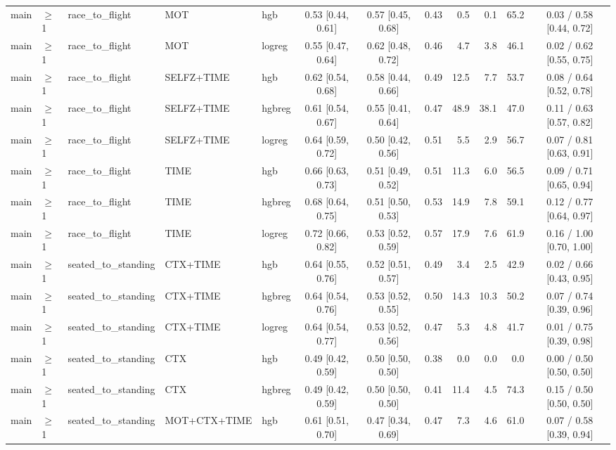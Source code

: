 \begin{longtable}{@{}lllllcccrrrc@{}}
main & $\geq$1 & race\_to\_flight & MOT & hgb & 0.53 [0.44, 0.61] & 0.57 [0.45, 0.68] & 0.43 & 0.5 & 0.1 & 65.2 & 0.03 / 0.58 [0.44, 0.72] \\
main & $\geq$1 & race\_to\_flight & MOT & logreg & 0.55 [0.47, 0.64] & 0.62 [0.48, 0.72] & 0.46 & 4.7 & 3.8 & 46.1 & 0.02 / 0.62 [0.55, 0.75] \\
main & $\geq$1 & race\_to\_flight & SELFZ+TIME & hgb & 0.62 [0.54, 0.68] & 0.58 [0.44, 0.66] & 0.49 & 12.5 & 7.7 & 53.7 & 0.08 / 0.64 [0.52, 0.78] \\
main & $\geq$1 & race\_to\_flight & SELFZ+TIME & hgbreg & 0.61 [0.54, 0.67] & 0.55 [0.41, 0.64] & 0.47 & 48.9 & 38.1 & 47.0 & 0.11 / 0.63 [0.57, 0.82] \\
main & $\geq$1 & race\_to\_flight & SELFZ+TIME & logreg & 0.64 [0.59, 0.72] & 0.50 [0.42, 0.56] & 0.51 & 5.5 & 2.9 & 56.7 & 0.07 / 0.81 [0.63, 0.91] \\
main & $\geq$1 & race\_to\_flight & TIME & hgb & 0.66 [0.63, 0.73] & 0.51 [0.49, 0.52] & 0.51 & 11.3 & 6.0 & 56.5 & 0.09 / 0.71 [0.65, 0.94] \\
main & $\geq$1 & race\_to\_flight & TIME & hgbreg & 0.68 [0.64, 0.75] & 0.51 [0.50, 0.53] & 0.53 & 14.9 & 7.8 & 59.1 & 0.12 / 0.77 [0.64, 0.97] \\
main & $\geq$1 & race\_to\_flight & TIME & logreg & 0.72 [0.66, 0.82] & 0.53 [0.52, 0.59] & 0.57 & 17.9 & 7.6 & 61.9 & 0.16 / 1.00 [0.70, 1.00] \\
main & $\geq$1 & seated\_to\_standing & CTX+TIME & hgb & 0.64 [0.55, 0.76] & 0.52 [0.51, 0.57] & 0.49 & 3.4 & 2.5 & 42.9 & 0.02 / 0.66 [0.43, 0.95] \\
main & $\geq$1 & seated\_to\_standing & CTX+TIME & hgbreg & 0.64 [0.54, 0.76] & 0.53 [0.52, 0.55] & 0.50 & 14.3 & 10.3 & 50.2 & 0.07 / 0.74 [0.39, 0.96] \\
main & $\geq$1 & seated\_to\_standing & CTX+TIME & logreg & 0.64 [0.54, 0.77] & 0.53 [0.52, 0.56] & 0.47 & 5.3 & 4.8 & 41.7 & 0.01 / 0.75 [0.39, 0.98] \\
main & $\geq$1 & seated\_to\_standing & CTX & hgb & 0.49 [0.42, 0.59] & 0.50 [0.50, 0.50] & 0.38 & 0.0 & 0.0 & 0.0 & 0.00 / 0.50 [0.50, 0.50] \\
main & $\geq$1 & seated\_to\_standing & CTX & hgbreg & 0.49 [0.42, 0.59] & 0.50 [0.50, 0.50] & 0.41 & 11.4 & 4.5 & 74.3 & 0.15 / 0.50 [0.50, 0.50] \\
main & $\geq$1 & seated\_to\_standing & MOT+CTX+TIME & hgb & 0.61 [0.51, 0.70] & 0.47 [0.34, 0.69] & 0.47 & 7.3 & 4.6 & 61.0 & 0.07 / 0.58 [0.39, 0.94] \\

\end{longtable}

